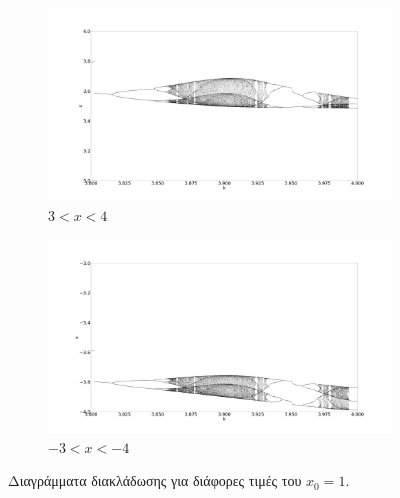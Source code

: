 \begin{figure}[ht]
	\centering
	
	\begin{subfigure}[b]{0.8\textwidth}
		\centering
		\includegraphics[width=\textwidth]{LateX images/sine q=-0.5/g12}
		\caption{$3<x<4$}
		\label{f:g524}
	\end{subfigure}
	\hfill
	\begin{subfigure}[b]{0.8\textwidth}
		\centering
		\includegraphics[width=\textwidth]{LateX images/sine q=-0.5/g12.2}
		\caption{$-3<x<-4$}
		\label{f:g525}
	\end{subfigure}
	\caption{Διαγράμματα διακλάδωσης για διάφορες τιμές του $x_0=1$. }
	\label{f:g239}
\end{figure}


